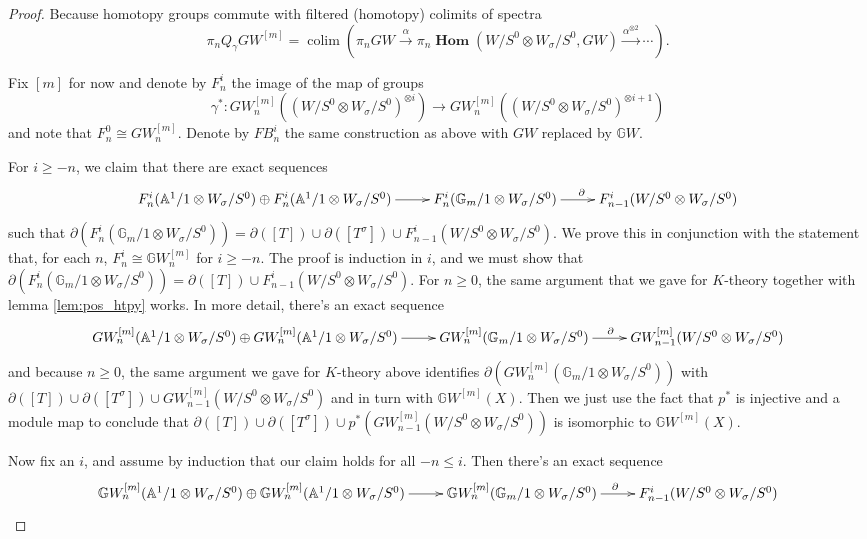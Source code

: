 \documentclass[edeposit,fullpage]{uiucthesis2009}
\newcommand{\mbb}{\mathbb}
\DeclareMathOperator*{\colim}{colim}
\DeclareMathOperator{\iHom}{\mathbf{Hom}}
\theoremstyle{plain}
\numberwithin{lemma}{section}
\theoremstyle{definition}
\begin{document}
\begin{proof}
Because homotopy groups
commute with filtered (homotopy) colimits of spectra
\[
\pi_nQ_\gamma GW^{[m]} = \colim(\pi_n GW \xrightarrow{\alpha} \pi_n\iHom(W/S^0
\otimes W_\sigma/S^0,GW) \xrightarrow{\alpha^{\otimes  2}} \cdots).
\]

Fix $[m]$ for now and denote by $F^i_n$ the image of the map of groups
\[
\gamma^* : GW_n^{[m]}((W/S^0 \otimes W_\sigma/S^0)^{\otimes i})
\rightarrow GW_n^{[m]}((W/S^0 \otimes W_\sigma/S^0)^{\otimes i+1})
\]
and note that $F^0_n \cong GW^{[m]}_n$. Denote by $FB^i_n$ the same
construction as above with $GW$ replaced by $\mbb GW$.

For $i \geq -n$, we claim that there are exact sequences
\[
\xymatrix{F^i_n(\mbb A^1/1 \otimes W_\sigma/S^0)  \oplus F^i_n(\mbb
  A^1/1 \otimes W_\sigma/S^0)  \ar[r] & F^i_n(\mbb G_m/1 \otimes W_\sigma/S^0) \ar[r]^{\partial} &
  F^{i}_{n-1}(W/S^0 \otimes W_\sigma/S^0) }
\]
such that $\partial(F^i_n(\mbb
G_m/1 \otimes W_\sigma/S^0)) = \partial([T]) \cup \partial([T^\sigma])
\cup  F^{i}_{n-1}(W/S^0 \otimes W_\sigma/S^0)$. We prove this in conjunction with the
statement that, for each $n$,  $F^i_n \cong \mbb
GW^{[m]}_n$ for $i \geq -n$. The proof is induction in $i$, and we
must show that $\partial(F^i_n(\mbb
G_m/1 \otimes W_\sigma/S^0)) = \partial([T]) \cup  F^{i}_{n-1}(W/S^0
\otimes W_\sigma/S^0)$. For $n \geq 0$, the same argument that we
gave for $K$-theory together with lemma \ref{lem:pos_htpy} works. In
more detail, there's an exact sequence
\[
\xymatrix{GW^{[m]}_n(\mbb A^1/1 \otimes W_\sigma/S^0)  \oplus GW^{[m]}_n(\mbb
  A^1/1 \otimes W_\sigma/S^0)  \ar[r] & GW^{[m]}_n(\mbb G_m/1 \otimes W_\sigma/S^0) \ar[r]^{\partial} &
  GW^{[m]}_{n-1}(W/S^0 \otimes W_\sigma/S^0)  }
\]
and because $n \geq 0$, the same argument we gave for $K$-theory above
identifies $\partial( GW^{[m]}_n(\mbb G_m/1 \otimes W_\sigma/S^0))$
with $\partial([T]) \cup \partial([T^\sigma]) \cup
GW^{[m]}_{n-1}(W/S^0\otimes W_\sigma/S^0)$ and in turn
with $\mbb GW^{[m]}(X)$. Then we just use the fact that $p^*$ is
injective and a module map to conclude that $\partial([T]) \cup \partial([T^\sigma]) \cup
p^*(GW^{[m]}_{n-1}(W/S^0\otimes W_\sigma/S^0))$ is isomorphic to $\mbb GW^{[m]}(X)$.

Now fix an $i$, and assume by induction that our claim holds for all
$-n \leq i$. Then there's an exact sequence 
\[
\xymatrix{\mbb GW^{[m]}_n(\mbb A^1/1 \otimes W_\sigma/S^0)  \oplus
  \mbb GW^{[m]}_n(\mbb
  A^1/1 \otimes W_\sigma/S^0)  \ar[r] & \mbb GW^{[m]}_n(\mbb G_m/1
  \otimes W_\sigma/S^0) \ar[r]^{\partial} & F^{i}_{n-1}(W/S^0 \otimes W_\sigma/S^0)
}
\]


\end{proof}
\end{document}
